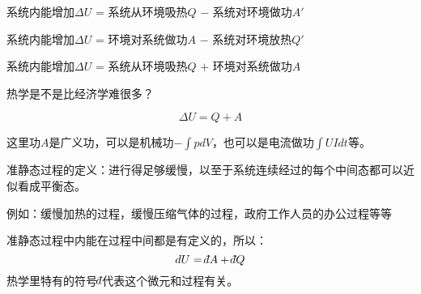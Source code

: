 \documentclass[CJK]{beamer}
\begin{document}
\begin{frame}
\bch
{}
\ech
\end{frame}


\begin{frame}
\bch
\tbox
{\small 系统内能增加$\Delta U$ = 系统从环境吸热$Q$ $-$  系统对环境做功$A'$}

\ech
\end{frame}


\begin{frame}
\bch
\tbox
{\small 系统内能增加$\Delta U$ = 环境对系统做功$A$ $-$ 系统对环境放热$Q'$}

\ech
\end{frame}

\begin{frame}
\bch
\tbox
{\small 系统内能增加$\Delta U$ = 系统从环境吸热$Q$ $+$ 环境对系统做功$A$}
\ech
\end{frame}

\begin{frame}
\bch

\huaixiao 热学是不是比经济学难很多？
\ech
\end{frame}


\begin{frame}
\bch
$$ \Delta U =  Q + A $$

\skiplines

这里功$A$是{\blue 广义功}，可以是机械功$-\int pdV$，也可以是电流做功$\int UIdt$等。
\ech
\end{frame}

\begin{frame}
\bch
准静态过程的定义：{\blue 进行得足够缓慢，以至于系统连续经过的每个中间态都可以近似看成平衡态。}

\skiplines

{\small 例如：缓慢加热的过程，缓慢压缩气体的过程，政府工作人员的办公过程等等}


\ech
\end{frame}


\begin{frame}
\bch
准静态过程中内能在过程中间都是有定义的，所以：
{\blue
$$dU = \dbar A + \dbar Q$$
}
热学里特有的符号$\dbar$代表这个微元和过程有关。

\ech
\end{frame}
\end{document}
